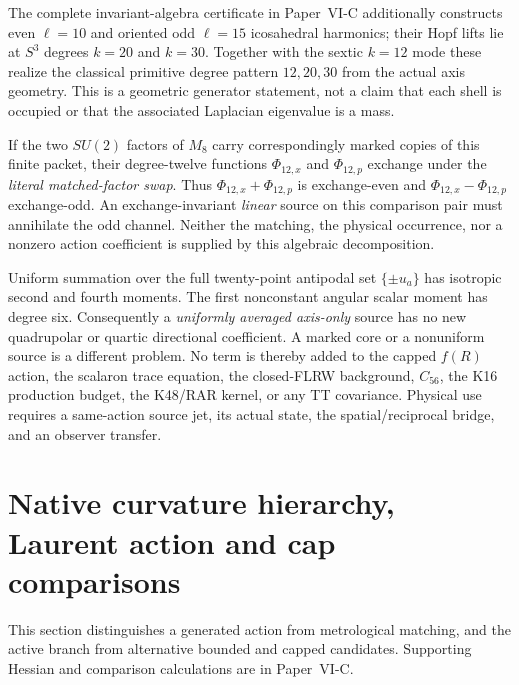 \documentclass[12pt,a4paper]{article}
\begin{document}
\begin{corollary}
\label{p6a:cor:v322-primitive-tower}
The complete invariant-algebra certificate in Paper~VI-C additionally
constructs even $\ell=10$ and oriented odd $\ell=15$ icosahedral
harmonics; their Hopf lifts lie at $S^3$ degrees $k=20$ and $k=30$.
Together with the sextic $k=12$ mode these realize the classical
primitive degree pattern $12,20,30$ from the actual axis geometry.
This is a geometric generator statement, not a claim that each shell
is occupied or that the associated Laplacian eigenvalue is a mass.
\end{corollary}

\begin{corollary}
\label{p6a:cor:v322-reciprocal-sextic}
If the two $SU(2)$ factors of $M_8$ carry correspondingly marked copies of
this finite packet, their degree-twelve functions $\Phi_{12,x}$ and
$\Phi_{12,p}$ exchange under the \emph{literal matched-factor swap}.
Thus $\Phi_{12,x}+\Phi_{12,p}$ is exchange-even and
$\Phi_{12,x}-\Phi_{12,p}$ exchange-odd.  An exchange-invariant \emph{linear}
source on this comparison pair must annihilate the odd channel.
Neither the matching, the physical occurrence, nor a nonzero action
coefficient is supplied by this algebraic decomposition.
\end{corollary}

\begin{remark}
\label{p6a:rem:v322-action-firewall}
Uniform summation over the full twenty-point antipodal set
$\{\pm u_a\}$ has isotropic second and fourth moments.  The first
nonconstant angular scalar moment has degree six.  Consequently a
\emph{uniformly averaged axis-only} source has no new quadrupolar or
quartic directional coefficient.  A marked core or a nonuniform source
is a different problem.  No term is thereby added to the capped
$f(R)$ action, the scalaron trace equation, the closed-FLRW background,
$C_{56}$, the K16 production budget, the K48/RAR kernel, or any
TT covariance.  Physical use requires a same-action source jet, its
actual state, the spatial/reciprocal bridge, and an observer transfer.
\end{remark}


\section{Native curvature hierarchy, Laurent action and cap comparisons}
\label{p6a:sec:organized-a2}
This section distinguishes a generated action from metrological matching, and the active branch from alternative bounded and capped candidates. Supporting Hessian and comparison calculations are in Paper~VI-C.
\end{document}

